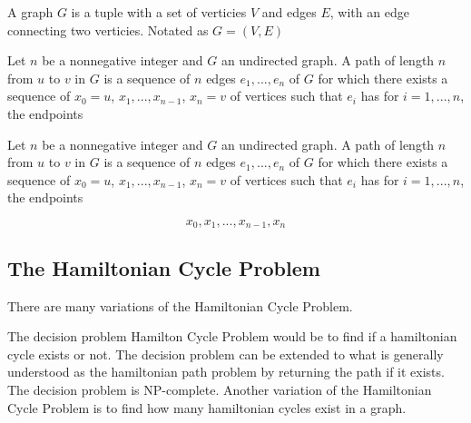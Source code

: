 \begin{definition}[Graph]
    A graph $G$ is a tuple with a set of verticies $V$ and edges $E$, with an
    edge connecting two verticies. Notated as $G = (V, E)$
\end{definition}

\begin{definition}
    Let $n$ be a nonnegative integer and $G$ an undirected graph. A path of
    length $n$ from $u$ to $v$ in $G$ is a sequence of $n$ edges $e_1,...,e_n$
    of $G$ for which there exists a sequence of $x_0 = u$, $x_1, ..., x_{n-1}$,
    $x_n = v$ of vertices such that $e_i$ has for $i = 1, ..., n$, the endpoints

\end{definition}

\begin{definition}
    Let $n$ be a nonnegative integer and $G$ an undirected graph. A path of
    length $n$ from $u$ to $v$ in $G$ is a sequence of $n$ edges $e_1,...,e_n$
    of $G$ for which there exists a sequence of $x_0 = u$, $x_1, ..., x_{n-1}$,
    $x_n = v$ of vertices such that $e_i$ has for $i = 1, ..., n$, the endpoints

\end{definition}

\begin{definition}

\end{definition}

\begin{equation}
    x_0, x_1, ..., x_{n-1}, x_n
\end{equation}

\subsection{The Hamiltonian Cycle Problem}

There are many variations of the Hamiltonian Cycle Problem.

The decision problem Hamilton Cycle Problem would be to find if a hamiltonian
cycle exists or not. The decision problem can be extended to what is generally
understood as the hamiltonian path problem by returning the path if it exists.
The decision problem is NP-complete. Another variation of the Hamiltonian Cycle
Problem is to find how many hamiltonian cycles exist in a graph.

